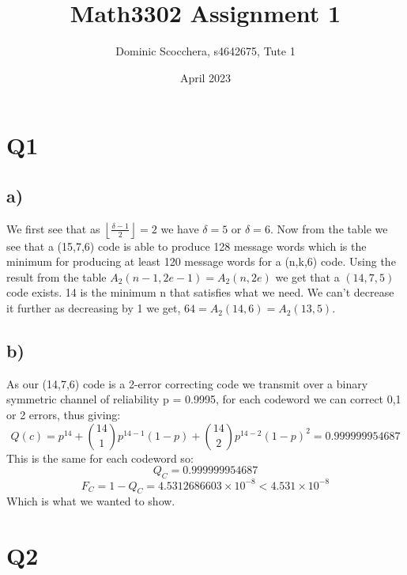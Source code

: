 \documentclass{article}
\title{Math3302 Assignment 1}
\author{Dominic Scocchera, s4642675, Tute 1}
\date{April 2023}
\begin{document}
\maketitle
\section*{Q1}
\subsection*{a)}
We first see that as $\left\lfloor\frac{\delta-1}{2}\right\rfloor=2$ we have $\delta=5$ or $\delta=6$. Now from the table we see that a (15,7,6) code is able to produce 128 message words which is the minimum for producing at least 120 message words for a (n,k,6) code. Using the result from the table $A_2(n-1,2e-1)=A_2(n,2e)$ we get that a $(14,7,5)$ code exists. 14 is the minimum n that satisfies what we need. We can't decrease it further as decreasing by 1 we get, $64=A_2(14,6)=A_2(13,5)$.
\subsection*{b)}
As our (14,7,6) code is a 2-error correcting code we transmit over a binary symmetric channel of reliability p = 0.9995, for each codeword we can correct 0,1 or 2 errors, thus giving:
$$Q(c)=p^{14}+{14 \choose 1}p^{14-1}(1-p)+{14 \choose 2}p^{14-2}(1-p)^2=0.999999954687$$
This is the same for each codeword so:
$$Q_C=0.999999954687$$
$$F_C=1-Q_C=4.5312686603\times10^{-8}<4.531\times10^{-8}$$
Which is what we wanted to show.
\section*{Q2}
\end{document}
